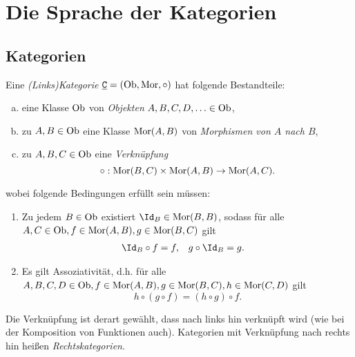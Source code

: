 \chapter{Die Sprache der Kategorien}



\section{Kategorien}


\begin{df}[Katogorie]
	Eine \emph{(Links)Kategorie} $\underline{\mathtt{C}} = (\mathrm{Ob}, \operatorname{Mor}, \circ)$ hat folgende Bestandteile:
	\begin{enumerate}[a)]
		\item
			eine Klasse $\mathrm{Ob}$ von \emph{Objekten} $A, B, C, D, \dotsc \in \mathrm{Ob}$,
		\item
			zu $A, B \in \mathrm{Ob}$ eine Klasse $\operatorname{Mor}(A,B)$ von \emph{Morphismen von $A$ nach $B$},
		\item
			zu $A, B, C \in \mathrm{Ob}$ eine \emph{Verknüpfung}
			\[
				\circ: \operatorname{Mor}(B, C) \times \operatorname{Mor}(A, B) \to \operatorname{Mor}(A, C).
			\]
	\end{enumerate}
	wobei folgende Bedingungen erfüllt sein müssen:
	\begin{enumerate}[1)]
		\item
			Zu jedem $B \in \mathrm{Ob}$ existiert $\Id_B \in \Mor(B, B)$, sodass für alle $A, C \in \mathrm{Ob}, f \in \operatorname{Mor}(A, B), g \in \operatorname{Mor}(B, C)$ gilt
			\begin{align*}
				\Id_B \circ f &= f, &
				g \circ \Id_B &= g.
			\end{align*}
		\item
			Es gilt Assoziativität, d.h. für alle $A, B, C, D \in \mathrm{Ob}, f \in \operatorname{Mor}(A, B), g \in \operatorname{Mor}(B, C), h \in \operatorname{Mor}(C, D)$ gilt
			\[
				h \circ (g \circ f) = (h \circ g) \circ f.
			\]
	\end{enumerate}
	\begin{note}
		Die Verknüpfung ist derart gewählt, dass nach links hin verknüpft wird (wie bei der Komposition von Funktionen auch).
		Kategorien mit Verknüpfung nach rechts hin heißen \emph{Rechtskategorien}.
	\end{note}
\end{df}

